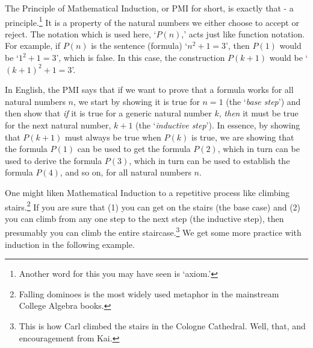 \documentclass{ximera}
\begin{document}


 

 The Principle of Mathematical Induction, or PMI for short, is exactly that - a principle.\footnote{Another word for this you may have seen is `axiom.'}  It is a property of the natural numbers we either choose to accept or reject.  The notation which is used here, `$P(n)$,' acts just like function notation.  For example, if $P(n)$ is the sentence (formula)  `$n^2 + 1 = 3$', then $P(1)$ would be `$1^2 + 1 = 3$', which is false.  In this case, the construction $P(k+1)$ would be `$(k+1)^2 + 1 = 3$'.  

 

In English, the PMI says that if we want to prove that a formula works for all natural numbers $n$, we start by showing it is true for $n=1$ (the  `\textit{base step}') and then show that \textit{if} it is true for a generic natural number $k$, \textit{then} it must be true for the next natural number, $k+1$ (the  `\textit{inductive step}').  In essence, by showing that $P(k+1)$ must always be true when $P(k)$ is true, we are showing that the formula $P(1)$ can be used to get the formula $P(2)$, which in turn can be used to derive the formula $P(3)$, which in turn can be used to establish the formula $P(4)$, and so on, for all natural numbers $n$.


 

One might liken Mathematical Induction to a repetitive process like climbing stairs.\footnote{Falling dominoes is the most widely used metaphor in the mainstream College Algebra books.}  If you are sure that (1) you can get on the stairs (the base case) and (2) you can climb from any one step to the next step (the inductive step), then presumably you can climb the entire staircase.\footnote{This is how Carl climbed the stairs in the Cologne Cathedral.  Well, that, and  encouragement from  Kai.}  We get some more practice with induction in the following example.

\newpage
\end{document}
